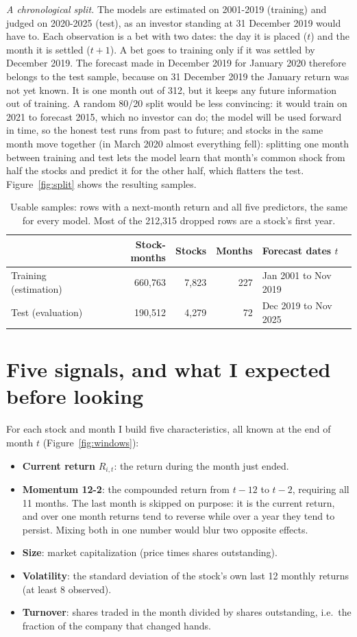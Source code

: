 \documentclass[10pt,a4paper]{article}
\begin{document}
\textit{A chronological split.} The models are estimated on 2001-2019 (training) and judged on 2020-2025 (test),
as an investor standing at 31 December 2019 would have to. Each observation is a bet with two dates: the day it is
placed ($t$) and the month it is settled ($t+1$). A bet goes to training only if it was settled by December 2019.
The forecast made in December 2019 for January 2020 therefore belongs to the test sample, because on 31 December
2019 the January return was not yet known. It is one month out of 312, but it keeps any future information out of
training. A random 80/20 split would be less convincing: it would train on 2021 to forecast 2015, which no investor
can do; the model will be used forward in time, so the honest test runs from past to future; and
stocks in the same month move together (in March 2020 almost everything fell): splitting one month between training
and test lets the model learn that month's common shock from half the stocks and predict it for the other half,
which flatters the test. Figure~\ref{fig:split} shows the resulting samples.

\begin{table}[h]
\centering\small
\begin{tabular}{lrrrl}
\toprule
& Stock-months & Stocks & Months & Forecast dates $t$ \\
\midrule
Training (estimation) & 660,763 & 7,823 & 227 & Jan 2001 to Nov 2019 \\
Test (evaluation) & 190,512 & 4,279 & 72 & Dec 2019 to Nov 2025 \\
\bottomrule
\end{tabular}
\caption{Usable samples: rows with a next-month return and all five predictors, the same for every model. Most of
the 212,315 dropped rows are a stock's first year.}
\label{tab:samples}
\end{table}

\section{Five signals, and what I expected before looking}

For each stock and month I build five characteristics, all known at the end of month $t$
(Figure~\ref{fig:windows}):
\begin{itemize}
\item \textbf{Current return} $R_{i,t}$: the return during the month just ended.
\item \textbf{Momentum 12-2}: the compounded return from $t-12$ to $t-2$, requiring all 11 months. The last month is
skipped on purpose: it is the current return, and over one month returns tend to reverse while over a year they tend
to persist. Mixing both in one number would blur two opposite effects.
\item \textbf{Size}: market capitalization (price times shares outstanding).
\item \textbf{Volatility}: the standard deviation of the stock's own last 12 monthly returns (at least 8 observed).
\item \textbf{Turnover}: shares traded in the month divided by shares outstanding, i.e.\ the fraction of the company
that changed hands.
\end{itemize}
\end{document}
